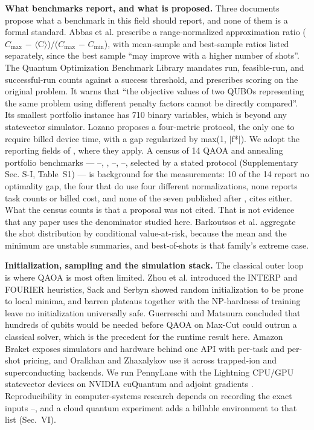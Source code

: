 \documentclass{ieeeaccess}
\begin{document}
\textbf{What benchmarks report, and what is proposed.} Three documents propose what a benchmark in this field should report, and none of them is a formal standard. Abbas et al. \cite{ref22} prescribe a range-normalized approximation ratio ($C_{\mathrm{max}}$ $-$ $\langle$C$\rangle$)/($C_{\mathrm{max}}$ $-$ $C_{\mathrm{min}}$), with mean-sample and best-sample ratios listed separately, since the best sample ``may improve with a higher number of shots''. The Quantum Optimization Benchmark Library \cite{ref23} mandates run, feasible-run, and successful-run counts against a success threshold, and prescribes scoring on the original problem. It warns that ``the objective values of two QUBOs representing the same problem using different penalty factors cannot be directly compared''. Its smallest portfolio instance has 710 binary variables, which is beyond any statevector simulator. Lozano \cite{ref24} proposes a four-metric protocol, the only one to require billed device time, with a gap regularized by max(1, $|$f*$|$). We adopt the reporting fields of \cite{ref22}, \cite{ref23} where they apply. A census of 14 QAOA and annealing portfolio benchmarks --- \cite{ref8}--\cite{ref10}, \cite{ref13}, \cite{ref15}--\cite{ref18}, \cite{ref25}--\cite{ref30}, selected by a stated protocol (Supplementary Sec. S-I, Table~S1) --- is background for the measurements: 10 of the 14 report no optimality gap, the four that do use four different normalizations, none reports task counts or billed cost, and none of the seven published after \cite{ref22}, \cite{ref23} cites either. What the census counts is that a proposal was not cited. That is not evidence that any paper uses the denominator studied here. Barkoutsos et al. \cite{ref31} aggregate the shot distribution by conditional value-at-risk, because the mean and the minimum are unstable summaries, and best-of-shots is that family's extreme case.


\textbf{Initialization, sampling and the simulation stack.} The classical outer loop is where QAOA is most often limited. Zhou et al. \cite{ref32} introduced the INTERP and FOURIER heuristics, Sack and Serbyn \cite{ref33} showed random initialization to be prone to local minima, and barren plateaus \cite{ref34} together with the NP-hardness of training \cite{ref35} leave no initialization universally safe. Guerreschi and Matsuura \cite{ref36} concluded that hundreds of qubits would be needed before QAOA on Max-Cut could outrun a classical solver, which is the precedent for the runtime result here. Amazon Braket \cite{ref37} exposes simulators and hardware behind one API with per-task and per-shot pricing, and Oralkhan and Zhaxalykov \cite{ref26} use it across trapped-ion and superconducting backends. We run PennyLane \cite{ref38} with the Lightning CPU/GPU statevector devices on NVIDIA cuQuantum \cite{ref39} and adjoint gradients \cite{ref40}. Reproducibility in computer-systems research depends on recording the exact inputs \cite{ref41}--\cite{ref43}, and a cloud quantum experiment adds a billable environment to that list (Sec.~VI).
\end{document}
